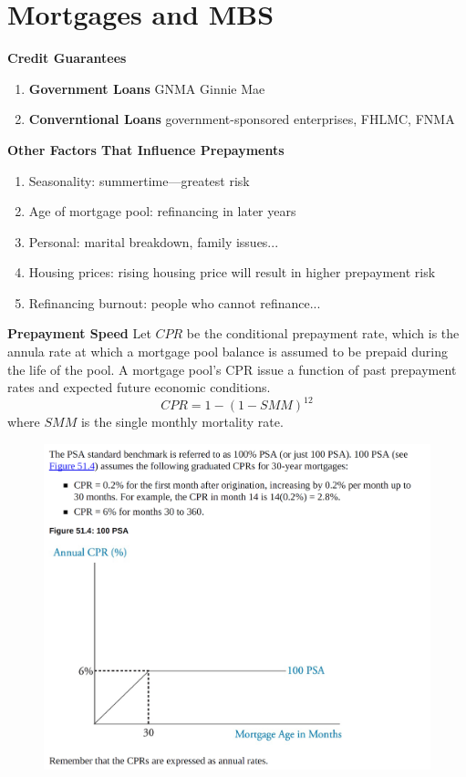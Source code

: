 \documentclass[11pt,fleqn]{report} %
\numberwithin{equation}{section} %
\numberwithin{figure}{section} %
\numberwithin{table}{section} %
\begin{document}
\chapter{Mortgages and MBS}
 \begin{definition}\textbf{Credit Guarantees}
    \begin{enumerate}
        \item \textbf{Government Loans} GNMA Ginnie Mae
        \item \textbf{Converntional Loans} government-sponsored enterprises, FHLMC, FNMA
    \end{enumerate}
 \end{definition}
 \begin{definition}\textbf{Other Factors That Influence Prepayments}
    \begin{enumerate}
        \item Seasonality: summertime---greatest risk
        \item Age of mortgage pool: refinancing in later years
        \item Personal: marital breakdown, family issues... 
        \item Housing prices: rising housing price will result in higher prepayment risk
        \item Refinancing burnout: people who cannot refinance... 
    \end{enumerate}
 \end{definition}
 \begin{defintion}\textbf{Prepayment Speed}
    Let $CPR$ be the conditional prepayment rate, which is the annula rate at which a mortgage
    pool balance is assumed to be prepaid during the life of the pool. A mortgage pool's CPR issue
    a function of past prepayment rates and expected future economic conditions.
    $$
    CPR=1-(1-SMM)^12
    $$
    where $SMM$ is the single monthly mortality rate.
 \end{defintion}
 \begin{figure}[h!]
    \centering
    \includegraphics[scale=0.6]{PSA.png}
 \end{figure}
 
\end{document}
